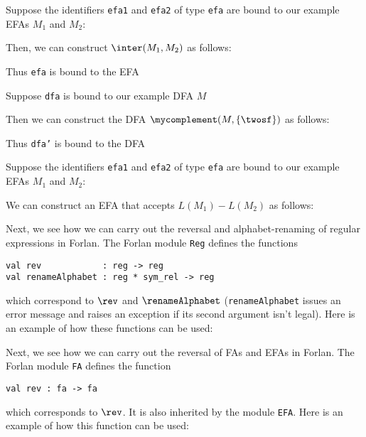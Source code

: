 Suppose the identifiers \texttt{efa1} and \texttt{efa2} of type \texttt{efa}
are bound to our example EFAs $M_1$ and $M_2$:
\begin{center}

\end{center}
Then, we can construct $\inter(M_1,M_2)$ as follows:

Thus \texttt{efa} is bound to the EFA
\begin{center}

\end{center}

Suppose \texttt{dfa} is bound to our example DFA $M$
\begin{center}

\end{center}
Then we can construct the DFA $\mycomplement(M,\{\twosf\})$
as follows:

Thus \texttt{dfa'} is bound to the DFA
\begin{center}

\end{center}

Suppose the identifiers \texttt{efa1} and \texttt{efa2} of type \texttt{efa}
are bound to our example EFAs $M_1$ and $M_2$:
\begin{center}

\end{center}
We can construct an EFA that accepts $L(M_1)-L(M_2)$ as follows:


Next, we see how we can carry out the reversal and alphabet-renaming
of regular expressions in Forlan.  The Forlan module \texttt{Reg}
defines the functions
\begin{verbatim}
val rev            : reg -> reg
val renameAlphabet : reg * sym_rel -> reg
\end{verbatim}
%
%
which correspond to $\rev$ and $\renameAlphabet$
%
%
%
%
(\texttt{renameAlphabet} issues an error message and raises
an exception if its second argument isn't legal).
Here is an example of how these functions can be used:


Next, we see how we can carry out the reversal of FAs and EFAs in
Forlan.  The Forlan module \texttt{FA} defines the function
\begin{verbatim}
val rev : fa -> fa
\end{verbatim}
%
which corresponds to $\rev$.
%
%
%
%
%
%
%
It is also inherited by the module \texttt{EFA}.
%
Here is an example of how this function can be used:


